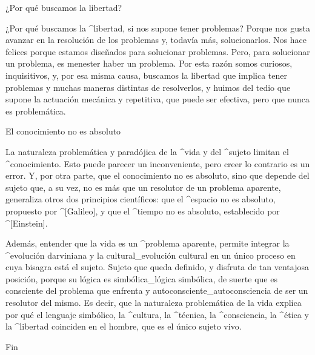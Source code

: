 \Section ¿Por qué buscamos la libertad?

¿Por qué buscamos la ^{libertad}, si nos supone tener problemas? Porque
nos gusta avanzar en la resolución de los problemas y, todavía más,
solucionarlos. Nos hace felices porque estamos diseñados para solucionar
problemas. Pero, para solucionar un problema, es menester haber un
problema. Por esta razón somos curiosos, inquisitivos, y, por esa misma
causa, buscamos la libertad que implica tener problemas y muchas maneras
distintas de resolverlos, y huimos del tedio que supone la actuación
mecánica y repetitiva, que puede ser efectiva, pero que nunca es
problemática.


\Section El conocimiento no es absoluto

La naturaleza problemática y paradójica de la ^{vida} y del ^{sujeto}
limitan el ^{conocimiento}. Esto puede parecer un inconveniente, pero
creer lo contrario es un error. Y, por otra parte, que el conocimiento
no es absoluto, sino que depende del sujeto que, a su vez, no es más que
un resolutor de un problema aparente, generaliza otros dos principios
científicos: que el ^{espacio} no es absoluto, propuesto por ^[Galileo],
y que el ^{tiempo} no es absoluto, establecido por ^[Einstein].

Además, entender que la vida es un ^{problema aparente}, permite
integrar la ^{evolución} darviniana y la cultural_{evolución cultural}
en un único proceso en cuya bisagra está el sujeto. Sujeto que queda
definido, y disfruta de tan ventajosa posición, porque su lógica es
simbólica_{lógica simbólica}, de suerte que es consciente del problema
que enfrenta y autoconsciente_{autoconsciencia} de ser un resolutor del
mismo. Es decir, que la naturaleza problemática de la vida explica por
qué el lenguaje simbólico, la ^{cultura}, la ^{técnica}, la
^{consciencia}, la ^{ética} y la ^{libertad} coinciden en el hombre, que
es el único sujeto vivo.

\baselineskip
\centerline{\fonttwo Fin}

\endinput
